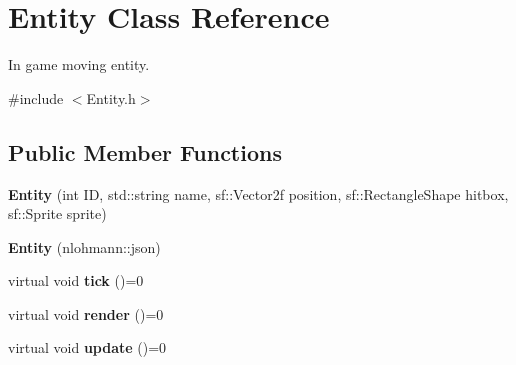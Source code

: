 \hypertarget{classEntity}{\section{Entity Class Reference}
\label{classEntity}
}


In game moving entity.  




{\ttfamily \#include $<$Entity.\-h$>$}

\subsection*{Public Member Functions}
\begin{DoxyCompactItemize}
\item 
\hypertarget{classEntity_a7685414a84c4052451ad7de8eea28f2b}{{\bfseries Entity} (int I\-D, std\-::string name, sf\-::\-Vector2f position, sf\-::\-Rectangle\-Shape hitbox, sf\-::\-Sprite sprite)}\label{classEntity_a7685414a84c4052451ad7de8eea28f2b}

\item 
\hypertarget{classEntity_a45c6ac38444033089ec95e3e7c26c0c8}{{\bfseries Entity} (nlohmann\-::json)}\label{classEntity_a45c6ac38444033089ec95e3e7c26c0c8}

\item 
\hypertarget{classEntity_ac6ae3c4257123d0725c541398328559b}{virtual void {\bfseries tick} ()=0}\label{classEntity_ac6ae3c4257123d0725c541398328559b}

\item 
\hypertarget{classEntity_aa7615728fd41ad13436908b1941f429b}{virtual void {\bfseries render} ()=0}\label{classEntity_aa7615728fd41ad13436908b1941f429b}

\item 
\hypertarget{classEntity_a59a29d9b7474baf13c9c76859242287d}{virtual void {\bfseries update} ()=0}\label{classEntity_a59a29d9b7474baf13c9c76859242287d}

\end{DoxyCompactItemize}
